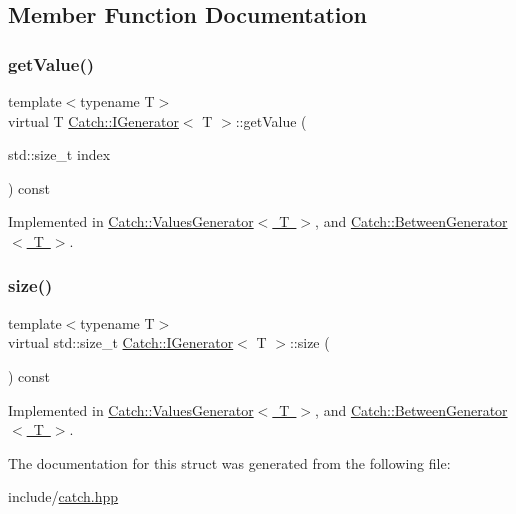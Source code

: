 \subsection{Member Function Documentation}
\mbox{\label{struct_catch_1_1_i_generator_ad69e937cb66dba3ed9429c42abf4fce3}} 
\subsubsection{\texorpdfstring{get\+Value()}{getValue()}}
{\footnotesize\ttfamily template$<$typename T$>$ \\
virtual T \mbox{\hyperlink{struct_catch_1_1_i_generator}{Catch\+::\+I\+Generator}}$<$ T $>$\+::get\+Value (\begin{DoxyParamCaption}\item[{std\+::size\+\_\+t}]{index }\end{DoxyParamCaption}) const\hspace{0.3cm}{\ttfamily [pure virtual]}}



Implemented in \mbox{\hyperlink{class_catch_1_1_values_generator_a9674c8b70d562d2d68154de92dd1810a}{Catch\+::\+Values\+Generator$<$ T $>$}}, and \mbox{\hyperlink{class_catch_1_1_between_generator_a913f74bb0c23b3bc0127abfffdabbd94}{Catch\+::\+Between\+Generator$<$ T $>$}}.

\mbox{\label{struct_catch_1_1_i_generator_a2e317253b03e838b6065ce69719a198e}} 
\subsubsection{\texorpdfstring{size()}{size()}}
{\footnotesize\ttfamily template$<$typename T$>$ \\
virtual std\+::size\+\_\+t \mbox{\hyperlink{struct_catch_1_1_i_generator}{Catch\+::\+I\+Generator}}$<$ T $>$\+::size (\begin{DoxyParamCaption}{ }\end{DoxyParamCaption}) const\hspace{0.3cm}{\ttfamily [pure virtual]}}



Implemented in \mbox{\hyperlink{class_catch_1_1_values_generator_a9aa5b140ee502975cf35115e534ab771}{Catch\+::\+Values\+Generator$<$ T $>$}}, and \mbox{\hyperlink{class_catch_1_1_between_generator_af65a1fe51f9b1106fc676e3dd189adb6}{Catch\+::\+Between\+Generator$<$ T $>$}}.



The documentation for this struct was generated from the following file\+:\begin{DoxyCompactItemize}
\item 
include/\mbox{\hyperlink{catch_8hpp}{catch.\+hpp}}\end{DoxyCompactItemize}
